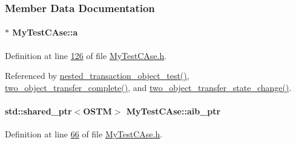 \subsubsection{Member Data Documentation}
\paragraph[{\texorpdfstring{a}{a}}]{$\ast$ My\+Test\+C\+Ase\+::a\hspace{0.3cm}{\ttfamily [private]}}\hypertarget{class_my_test_c_ase_a08f3a55850ffce171406f81f2f6c9c74_a08f3a55850ffce171406f81f2f6c9c74}{}\label{class_my_test_c_ase_a08f3a55850ffce171406f81f2f6c9c74_a08f3a55850ffce171406f81f2f6c9c74}


Definition at line \hyperlink{_my_test_c_ase_8h_source_l00126}{126} of file \hyperlink{_my_test_c_ase_8h_source}{My\+Test\+C\+Ase.\+h}.



Referenced by \hyperlink{_my_test_c_ase_8cpp_source_l00787}{nested\+\_\+transaction\+\_\+object\+\_\+test()}, \hyperlink{_my_test_c_ase_8cpp_source_l00748}{two\+\_\+object\+\_\+transfer\+\_\+complete()}, and \hyperlink{_my_test_c_ase_8cpp_source_l00765}{two\+\_\+object\+\_\+transfer\+\_\+state\+\_\+change()}.

\paragraph[{\texorpdfstring{aib\+\_\+ptr}{aib_ptr}}]{\setlength{\rightskip}{0pt plus 5cm}std\+::shared\+\_\+ptr$<${\bf O\+S\+TM}$>$ My\+Test\+C\+Ase\+::aib\+\_\+ptr}\hypertarget{class_my_test_c_ase_adad50e8278b64aa0321000b528e5362c_adad50e8278b64aa0321000b528e5362c}{}\label{class_my_test_c_ase_adad50e8278b64aa0321000b528e5362c_adad50e8278b64aa0321000b528e5362c}


Definition at line \hyperlink{_my_test_c_ase_8h_source_l00066}{66} of file \hyperlink{_my_test_c_ase_8h_source}{My\+Test\+C\+Ase.\+h}.



